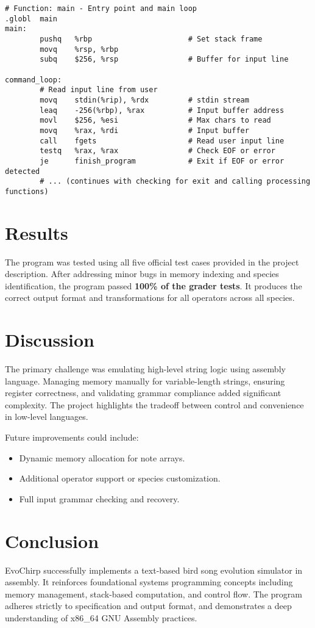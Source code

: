 \documentclass[11pt]{article}
\begin{document}
\begin{lstlisting}[language={[x86masm]Assembler}, basicstyle=\ttfamily\footnotesize]
# Function: main - Entry point and main loop
.globl  main
main:
        pushq   %rbp                      # Set stack frame
        movq    %rsp, %rbp
        subq    $256, %rsp                # Buffer for input line

command_loop:
        # Read input line from user
        movq    stdin(%rip), %rdx         # stdin stream
        leaq    -256(%rbp), %rax          # Input buffer address
        movl    $256, %esi                # Max chars to read
        movq    %rax, %rdi                # Input buffer
        call    fgets                     # Read user input line
        testq   %rax, %rax                # Check EOF or error
        je      finish_program            # Exit if EOF or error detected
        # ... (continues with checking for exit and calling processing functions)

\end{lstlisting}

\section{Results}
The program was tested using all five official test cases provided in the project description. After addressing minor bugs in memory indexing and species identification, the program passed \textbf{100\% of the grader tests}. It produces the correct output format and transformations for all operators across all species.

\section{Discussion}
The primary challenge was emulating high-level string logic using assembly language. Managing memory manually for variable-length strings, ensuring register correctness, and validating grammar compliance added significant complexity. The project highlights the tradeoff between control and convenience in low-level languages.

Future improvements could include:
\begin{itemize}[noitemsep]
    \item Dynamic memory allocation for note arrays.
    \item Additional operator support or species customization.
    \item Full input grammar checking and recovery.
\end{itemize}

\section{Conclusion}
EvoChirp successfully implements a text-based bird song evolution simulator in assembly. It reinforces foundational systems programming concepts including memory management, stack-based computation, and control flow. The program adheres strictly to specification and output format, and demonstrates a deep understanding of x86\_64 GNU Assembly practices.
\end{document}
